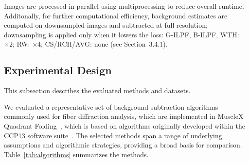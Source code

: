 \documentclass[iucr]{iucrjournals}
\begin{document}
Images are processed in parallel using multiprocessing to reduce overall runtime. Additonally, for further computational efficiency, background estimates are computed on downsampled images and subtracted at full resolution; downsampling is applied only when it lowers the loss: G-ILPF, B-ILPF, WTH: $\times 2$; RW: $ \times 4$; CS/RCH/AVG: none (see Section~3.4.1).







\subsection{Experimental Design}


This subsection describes the evaluated methods and datasets.


We evaluated a representative set of background subtraction algorithms commonly used for fiber diffraction analysis, which are implemented in MuscleX Quadrant Folding~\cite{JiratrakanvongEtAl2024,lee2019musclex}, which is based on algorithms originally developed within the CCP13 software suite~\cite{HeEtAl2007}. The selected methods span a range of underlying assumptions and algorithmic strategies, providing a broad basis for comparison. Table~\ref{tab:algorithms} summarizes the methods.
\end{document}
